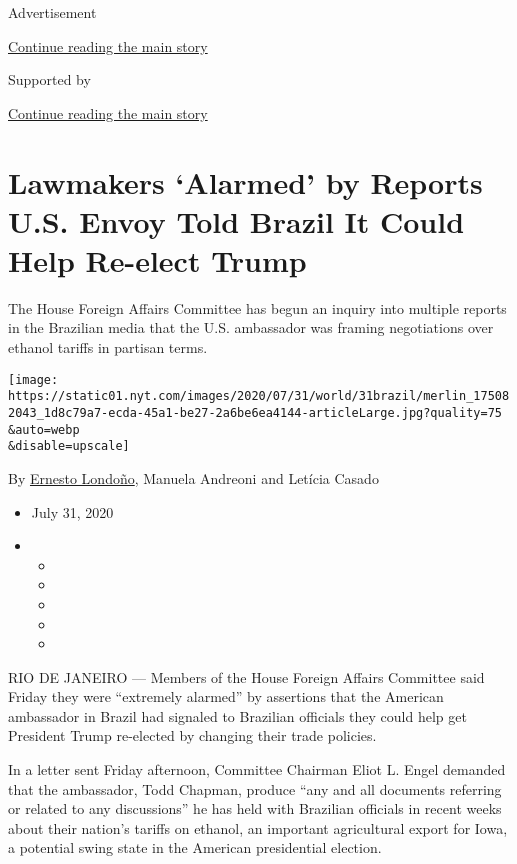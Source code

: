 Advertisement

\protect\hyperlink{after-top}{Continue reading the main story}

Supported by

\protect\hyperlink{after-sponsor}{Continue reading the main story}

\hypertarget{lawmakers-alarmed-by-reports-us-envoy-told-brazil-it-could-help-re-elect-trump}{%
\section{Lawmakers `Alarmed' by Reports U.S. Envoy Told Brazil It Could
Help Re-elect
Trump}\label{lawmakers-alarmed-by-reports-us-envoy-told-brazil-it-could-help-re-elect-trump}}

The House Foreign Affairs Committee has begun an inquiry into multiple
reports in the Brazilian media that the U.S. ambassador was framing
negotiations over ethanol tariffs in partisan terms.

\texttt{[image: https://static01.nyt.com/images/2020/07/31/world/31brazil/merlin\_175082043\_1d8c79a7-ecda-45a1-be27-2a6be6ea4144-articleLarge.jpg?quality=75\\\&auto=webp\\\&disable=upscale]}

By \href{https://www.nytimes.com/by/ernesto-londono}{Ernesto Londoño},
Manuela Andreoni and Letícia Casado

\begin{itemize}
\item
  July 31, 2020
\item
  \begin{itemize}
  \item
  \item
  \item
  \item
  \item
  \end{itemize}
\end{itemize}

RIO DE JANEIRO --- Members of the House Foreign Affairs Committee said
Friday they were ``extremely alarmed'' by assertions that the American
ambassador in Brazil had signaled to Brazilian officials they could help
get President Trump re-elected by changing their trade policies.

In a letter sent Friday afternoon, Committee Chairman Eliot L. Engel
demanded that the ambassador, Todd Chapman, produce ``any and all
documents referring or related to any discussions'' he has held with
Brazilian officials in recent weeks about their nation's tariffs on
ethanol, an important agricultural export for Iowa, a potential swing
state in the American presidential election.

